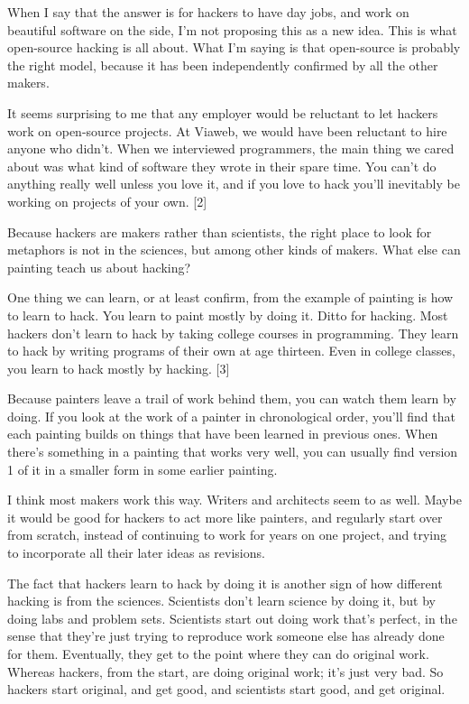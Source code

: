 When I say that the answer is for hackers to have day jobs, and work on
beautiful software on the side, I'm not proposing this as a new idea.
This is what open-source hacking is all about. What I'm saying is that
open-source is probably the right model, because it has been
independently confirmed by all the other makers.

It seems surprising to me that any employer would be reluctant to let
hackers work on open-source projects. At Viaweb, we would have been
reluctant to hire anyone who didn't. When we interviewed programmers,
the main thing we cared about was what kind of software they wrote in
their spare time. You can't do anything really well unless you love it,
and if you love to hack you'll inevitably be working on projects of your
own. {[}2{]}

Because hackers are makers rather than scientists, the right place to
look for metaphors is not in the sciences, but among other kinds of
makers. What else can painting teach us about hacking?

One thing we can learn, or at least confirm, from the example of
painting is how to learn to hack. You learn to paint mostly by doing it.
Ditto for hacking. Most hackers don't learn to hack by taking college
courses in programming. They learn to hack by writing programs of their
own at age thirteen. Even in college classes, you learn to hack mostly
by hacking. {[}3{]}

Because painters leave a trail of work behind them, you can watch them
learn by doing. If you look at the work of a painter in chronological
order, you'll find that each painting builds on things that have been
learned in previous ones. When there's something in a painting that
works very well, you can usually find version 1 of it in a smaller form
in some earlier painting.

I think most makers work this way. Writers and architects seem to as
well. Maybe it would be good for hackers to act more like painters, and
regularly start over from scratch, instead of continuing to work for
years on one project, and trying to incorporate all their later ideas as
revisions.

The fact that hackers learn to hack by doing it is another sign of how
different hacking is from the sciences. Scientists don't learn science
by doing it, but by doing labs and problem sets. Scientists start out
doing work that's perfect, in the sense that they're just trying to
reproduce work someone else has already done for them. Eventually, they
get to the point where they can do original work. Whereas hackers, from
the start, are doing original work; it's just very bad. So hackers start
original, and get good, and scientists start good, and get original.

